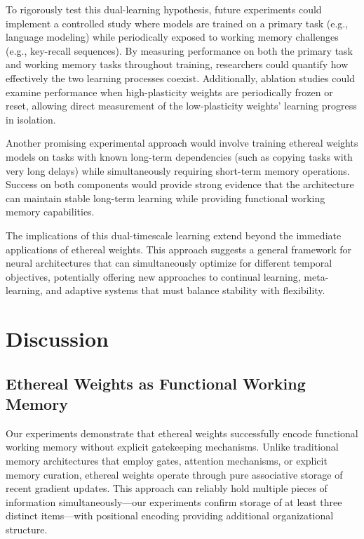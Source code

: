 \documentclass{article} %
\begin{document}
To rigorously test this dual-learning hypothesis, future experiments could implement a controlled study where models are trained on a primary task (e.g., language modeling) while periodically exposed to working memory challenges (e.g., key-recall sequences). By measuring performance on both the primary task and working memory tasks throughout training, researchers could quantify how effectively the two learning processes coexist. Additionally, ablation studies could examine performance when high-plasticity weights are periodically frozen or reset, allowing direct measurement of the low-plasticity weights' learning progress in isolation.

Another promising experimental approach would involve training ethereal weights models on tasks with known long-term dependencies (such as copying tasks with very long delays) while simultaneously requiring short-term memory operations. Success on both components would provide strong evidence that the architecture can maintain stable long-term learning while providing functional working memory capabilities.

The implications of this dual-timescale learning extend beyond the immediate applications of ethereal weights. This approach suggests a general framework for neural architectures that can simultaneously optimize for different temporal objectives, potentially offering new approaches to continual learning, meta-learning, and adaptive systems that must balance stability with flexibility.

\section{Discussion}

\subsection{Ethereal Weights as Functional Working Memory}

Our experiments demonstrate that ethereal weights successfully encode functional working memory without explicit gatekeeping mechanisms. Unlike traditional memory architectures that employ gates, attention mechanisms, or explicit memory curation, ethereal weights operate through pure associative storage of recent gradient updates. This approach can reliably hold multiple pieces of information simultaneously—our experiments confirm storage of at least three distinct items—with positional encoding providing additional organizational structure.
\end{document}
